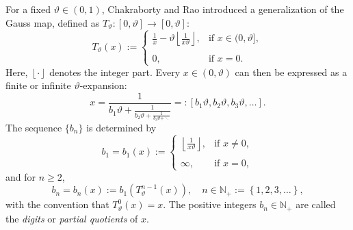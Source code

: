 \documentclass[final,1p,times]{elsarticle}
\numberwithin{equation}{section}
\begin{document}
For a fixed $\vartheta \in (0, 1)$, Chakraborty and Rao \cite{CR-2003} introduced a generalization of the Gauss map, defined as $T_{\vartheta}: [0,\vartheta] \to [0,\vartheta]$:
%
\begin{equation}
T_{\vartheta}(x):=
\left\{
\begin{array}{ll}
{\displaystyle \frac{1}{x} - \vartheta \left \lfloor \frac{1}{x \vartheta} \right\rfloor}, &
{\displaystyle \text{if } x \in (0, \vartheta],}\\
\\
0, & \text{if } x=0.
\end{array}
\right. \label{1.1}
\end{equation}
%
Here, $\left\lfloor \cdot \right\rfloor$ denotes the integer part.  
Every $x \in \left(0, \vartheta \right)$ can then be expressed as a finite or infinite $\vartheta$-expansion:
%
\begin{equation}
x = \frac{1}{\displaystyle b_1\vartheta
+\frac{1}{\displaystyle b_2\vartheta
+ \frac{1}{\displaystyle b_3\vartheta + \ddots} }} =: [b_1 \vartheta, b_2 \vartheta, b_3 \vartheta, \ldots]. \label{1.2}
\end{equation}
%
The sequence $\{b_n\}$ is determined by
%
\begin{equation*}
b_1=b_1(x) := \left\{\begin{array}{ll}
\left\lfloor \displaystyle \frac{1}{x \vartheta}\right\rfloor,  & \text{if }  x \neq 0, \\
\\
\infty, & \text{if }  x = 0,
\end{array} \right.
\end{equation*}
%
and for $n \geq 2$,
%
\begin{equation*}
b_n=b_n(x) := b_1\left(T_{\vartheta}^{n-1}(x)\right), \quad n \in \mathbb{N}_+ := \left\{1, 2, 3, \ldots\right\},
\end{equation*}
%
with the convention that $T_{\vartheta}^0 (x) = x$.  
The positive integers $b_n \in \mathbb{N}_+$ are called the \textit{digits} or \textit{partial quotients} of $x$.  
\end{document}
